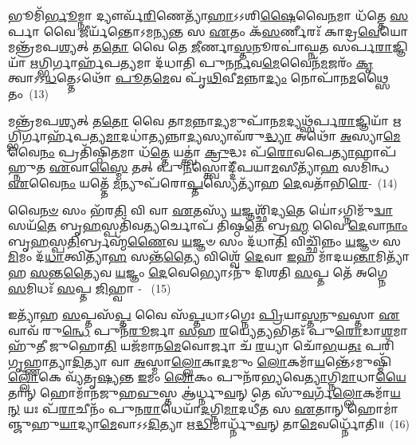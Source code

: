 𑌭𑍂𑌮𑌿᳴\-\ul{𑌰𑍍𑌭𑍂}\-𑌮𑍍𑌨𑌾 𑌦𑍍𑌯𑍗𑌰𑍍𑌵᳴\-\ul{𑌰𑌿}\-𑌣𑍇𑌤𑍍𑌯𑌾᳴\-\ul{𑌹𑌾}\-\-𑌽\-𑌽𑌶𑌿\-\ul{𑌷𑍈}\-𑌵𑍈\-\ul{𑌨}\-𑌮𑌾 𑌧᳴𑌤𑍍𑌤𑍇 \ul{𑌸}\-𑌰𑍍𑌪𑌾 𑌵𑍈 𑌜𑍀𑌰𑍍𑌯᳴𑌨𑍍𑌤𑍋\-𑌽𑌮𑌨𑍍𑌯\-\ul{𑌨𑍍𑌤} 𑌸 \ul{𑌏}\-𑌤𑌂 𑌕᳴\-\ul{𑌸}\-𑌰𑍍𑌣𑍀𑌰𑌃᳴ 𑌕𑌾𑌦𑍍𑌰\-\ul{𑌵𑍇}\-𑌯𑍋 𑌮𑌨𑍍𑌤𑍍𑌰᳴𑌮𑌪\-\ul{𑌶𑍍𑌯}\-𑌤𑍍 𑌤\-\ul{𑌤𑍋} 𑌵𑍈 𑌤𑍇 \ul{𑌜𑍀}\-𑌰𑍍𑌣𑌾\-\ul{𑌸𑍍𑌤}\-𑌨𑍂𑌰𑌪𑌾॑𑌘𑍍𑌨𑌤 𑌸𑌰𑍍𑌪\-\ul{𑌰𑌾}\-𑌜𑍍𑌞𑌿𑌯𑌾᳴ \ul{𑌋}\-𑌗𑍍𑌭𑌿𑌰𑍍𑌗𑌾𑌰𑍍\mbox{}𑌹᳴𑌪\-\ul{𑌤𑍍𑌯}\-𑌮𑌾 𑌦᳴𑌧𑌾𑌤𑌿 𑌪𑍁𑌨\-\ul{𑌰𑍍𑌨}\-𑌵\-\ul{𑌮𑍇}\-𑌵𑍈𑌨᳴\-\ul{𑌮}\-𑌜𑌰𑌂᳴ \ul{𑌕𑍃}\-𑌤𑍍𑌵𑌾\-𑌽\-𑌽\-\ul{𑌧}\-𑌤𑍍𑌤𑍇\-𑌽𑌥𑍋᳴ \ul{𑌪𑍂}\-𑌤\-\ul{𑌮𑍇}\-𑌵 𑌪𑍃᳴\-\ul{𑌥𑌿}\-𑌵𑍀\-\ul{𑌮}\-𑌨𑍍𑌨𑌾\-\ul{𑌦𑍍𑌯𑌂} 𑌨𑍋𑌪𑌾᳴𑌨\-\ul{𑌮}\-𑌥𑍍𑌸𑍈𑌤𑌂~(13)

𑌮𑌨𑍍𑌤𑍍𑌰᳴𑌮𑌪\-\ul{𑌶𑍍𑌯}\-𑌤𑍍 𑌤\-\ul{𑌤𑍋} 𑌵𑍈 𑌤𑌾\-\ul{𑌮}\-𑌨𑍍𑌨𑌾\-\ul{𑌦𑍍𑌯}\-𑌮𑍁𑌪𑌾᳴𑌨\-\ul{𑌮}\-𑌦𑍍𑌯𑌥𑍍𑌸᳴𑌰𑍍𑌪\-\ul{𑌰𑌾}\-𑌜𑍍𑌞𑌿𑌯𑌾᳴ \ul{𑌋}\-𑌗𑍍𑌭𑌿𑌰𑍍𑌗𑌾𑌰𑍍\mbox{}𑌹᳴𑌪𑌤𑍍𑌯\-\ul{𑌮𑌾}\-𑌦𑌧𑌾॑\-\ul{𑌤𑍍𑌯}\-𑌨𑍍𑌨𑌾\-\ul{𑌦𑍍𑌯}\-𑌸𑍍𑌯𑌾𑌵᳴𑌰𑍁\-\ul{𑌦𑍍𑌧𑍍𑌯𑌾} 𑌅𑌥𑍋᳴ \ul{𑌅}\-𑌸𑍍𑌯𑌾\-\ul{𑌮𑍇}\-𑌵𑍈\-\ul{𑌨𑌂} 𑌪𑍍𑌰𑌤𑌿᳴𑌷𑍍𑌠𑌿\-\ul{𑌤}\-𑌮𑌾 𑌧᳴\-\ul{𑌤𑍍𑌤𑍇} 𑌯𑌤𑍍𑌤𑍍𑌵𑌾॑ \ul{𑌕𑍍𑌰𑍁}\-𑌦𑍍𑌧𑌃 𑌪᳴\-\ul{𑌰𑍋}\-𑌵𑌪𑍇\-\ul{𑌤𑍍𑌯𑌾}\-𑌹𑌾𑌪᳴𑌹𑍍𑌨𑍁𑌤 \ul{𑌏}\-𑌵𑌾\-\ul{𑌸𑍍𑌮𑍈} 𑌤𑌤𑍍 𑌪𑍁\-\ul{𑌨}\-𑌸𑍍𑌤𑍍𑌵𑍋𑌦𑍍𑌦𑍀᳴𑌪𑌯𑌾\-\ul{𑌮}\-𑌸𑍀𑌤𑍍𑌯𑌾᳴\-\ul{𑌹} 𑌸𑌮𑌿᳴𑌨𑍍𑌧 \ul{𑌏}\-𑌵𑍈\-\ul{𑌨𑌂} 𑌯𑌤𑍍𑌤𑍇᳴ \ul{𑌮}\-𑌨𑍍𑌯𑍁𑌪᳴𑌰𑍋\-\ul{𑌪𑍍𑌤}\-𑌸𑍍𑌯𑍇𑌤𑍍𑌯𑌾᳴𑌹 \ul{𑌦𑍇}\-𑌵𑌤𑌾᳴𑌭𑌿\-\ul{𑌰𑍇}\--~(14)

𑌵𑍈\-\ul{𑌨}\-\-\ul{𑍞} 𑌸𑌂 𑌭᳴𑌰\-\ul{𑌤𑌿} 𑌵𑌿 𑌵𑌾 \ul{𑌏}\-𑌤𑌸𑍍𑌯᳴ \ul{𑌯}\-𑌜𑍍𑌞𑌶𑍍𑌛𑌿᳴𑌦𑍍𑌯\-\ul{𑌤𑍇} 𑌯𑍋॑\-𑌽𑌗𑍍𑌨𑌿𑌮𑍁᳴\-\ul{𑌦𑍍𑌵𑌾}\-𑌸𑌯᳴\-\ul{𑌤𑍇} 𑌬𑍃\-\ul{𑌹}\-𑌸𑍍𑌪𑌤𑌿᳴𑌵\-\ul{𑌤𑍍𑌯}\-𑌰𑍍𑌚𑍋𑌪᳴ 𑌤𑌿𑌷𑍍𑌠\-\ul{𑌤𑍇} 𑌬𑍍𑌰\-\ul{𑌹𑍍𑌮} 𑌵𑍈 \ul{𑌦𑍇}\-𑌵𑌾\-\ul{𑌨𑌾𑌂} 𑌬𑍃\-\ul{𑌹}\-𑌸𑍍𑌪\-\ul{𑌤𑌿}\-𑌰𑍍𑌬𑍍𑌰𑌹𑍍𑌮᳴\-\ul{𑌣𑍈}\-𑌵 \ul{𑌯}\-𑌜𑍍𑌞𑍞 𑌸𑌂 𑌦᳴𑌧𑌾\-\ul{𑌤𑌿} 𑌵𑌿𑌚𑍍𑌛𑌿᳴𑌨𑍍𑌨𑌂 \ul{𑌯}\-𑌜𑍍𑌞𑍞 𑌸\-\ul{𑌮𑌿}\-𑌮𑌂 𑌦᳴\-\ul{𑌧𑌾}\-𑌤𑍍𑌵𑌿𑌤𑍍𑌯𑌾᳴\-\ul{𑌹} 𑌸𑌨𑍍𑌤᳴\-\ul{𑌤𑍍𑌯𑍈} 𑌵𑌿𑌶𑍍𑌵𑍇᳴ \ul{𑌦𑍇}\-𑌵𑌾 \ul{𑌇}\-𑌹 𑌮𑌾᳴𑌦𑌯\-\ul{𑌨𑍍𑌤𑌾}\-𑌮𑌿𑌤𑍍𑌯𑌾᳴𑌹 \ul{𑌸}\-𑌨𑍍𑌤\-\ul{𑌤𑍍𑌯𑍈}\-𑌵 \ul{𑌯}\-𑌜𑍍𑌞𑌂 \ul{𑌦𑍇}\-𑌵𑍇𑌭𑍍𑌯𑍋\-𑌽𑌨𑍁᳴ 𑌦𑌿𑌶𑌤𑌿 \ul{𑌸}\-𑌪𑍍𑌤 𑌤𑍇᳴ 𑌅𑌗𑍍𑌨𑍇 \ul{𑌸}\-𑌮𑌿𑌧𑌃᳴ \ul{𑌸}\-𑌪𑍍𑌤 \ul{𑌜𑌿}\-𑌹𑍍𑌵𑌾 - ~(15)

𑌇𑌤𑍍𑌯𑌾᳴𑌹 \ul{𑌸}\-𑌪𑍍𑌤𑌸᳴\-\ul{𑌪𑍍𑌤} 𑌵𑍈 𑌸᳴\-\ul{𑌪𑍍𑌤}\-𑌧𑌾\-𑌽𑌗𑍍𑌨𑍇𑌃 \ul{𑌪𑍍𑌰𑌿}\-𑌯𑌾\-\ul{𑌸𑍍𑌤}\-𑌨𑍁\-\ul{𑌵}\-𑌸𑍍𑌤𑌾 \ul{𑌏}\-𑌵𑌾𑌵᳴ 𑌰𑍁\-\ul{𑌨𑍍𑌧𑍇} 𑌪𑍁𑌨᳴\-\ul{𑌰𑍂}\-𑌰𑍍𑌜𑌾 \ul{𑌸}\-𑌹 \ul{𑌰}\-𑌯𑍍𑌯𑍇\-\ul{𑌤𑍍𑌯}\-𑌭𑌿𑌤𑌃᳴ 𑌪𑍁\-\ul{𑌰𑍋}\-𑌡𑌾\-\ul{𑌶}\-𑌮𑌾𑌹𑍁᳴𑌤𑍀 𑌜𑍁𑌹𑍋\-\ul{𑌤𑌿} 𑌯𑌜᳴𑌮𑌾𑌨\-\ul{𑌮𑍇}\-𑌵𑍋𑌰𑍍𑌜𑌾 𑌚᳴ \ul{𑌰}\-𑌯𑍍𑌯𑌾 𑌚𑍋᳴\-\ul{𑌭}\-𑌯\-\ul{𑌤𑌃} 𑌪𑌰𑌿᳴ 𑌗𑍃𑌹𑍍𑌣𑌾𑌤𑍍𑌯𑌾\-\ul{𑌦𑌿}\-𑌤𑍍𑌯𑌾 𑌵𑌾 \ul{𑌅}\-𑌸𑍍𑌮𑌾\-\ul{𑌲𑍍𑌲𑍋}\-𑌕𑌾\-\ul{𑌦}\-𑌮𑍁𑌂 \ul{𑌲𑍋}\-𑌕𑌮𑌾᳴\-\ul{𑌯}\-𑌨𑍍𑌤𑍇᳴\-𑌽𑌮𑍁𑌷𑍍𑌮𑌿᳴\-\ul{𑌲𑍍𑌲𑍋𑌁}\-𑌕𑍇 𑌵𑍍𑌯᳴𑌤𑍃\-\ul{𑌷𑍍𑌯}\-𑌨𑍍𑌤 \ul{𑌇}\-𑌮𑌂 \ul{𑌲𑍋}\-𑌕𑌂 𑌪𑍁𑌨᳴𑌰\-\ul{𑌭𑍍𑌯}\-𑌵𑍇\-\ul{𑌤𑍍𑌯𑌾}\-𑌗𑍍𑌨𑌿\-\ul{𑌮𑌾}\-𑌧𑌾\-\ul{𑌯𑍈}\-𑌤𑌾𑌨𑍍 𑌹𑍋𑌮𑌾᳴𑌨𑌜𑍁𑌹\-\ul{𑌵𑍁}\-𑌸𑍍𑌤 𑌆॑𑌰𑍍𑌧𑍍𑌨𑍁\-\ul{𑌵}\-𑌨𑍍 𑌤𑍇 𑌸𑍁᳴\-\ul{𑌵}\-𑌰𑍍𑌗𑌁\-\ul{𑌲𑍍𑌲𑍋}\-𑌕𑌮𑌾᳴\-\ul{𑌯}\-\-\ul{𑌨𑍍} 𑌯𑌃 𑌪᳴\-\ul{𑌰𑌾}\-𑌚𑍀𑌨𑌂᳴ 𑌪𑍁𑌨\-\ul{𑌰𑌾}\-𑌧𑍇𑌯𑌾᳴\-\ul{𑌦}\-𑌗𑍍𑌨𑌿\-\ul{𑌮𑌾}\-𑌦𑌧𑍀᳴\-\ul{𑌤} 𑌸 \ul{𑌏}\-𑌤𑌾𑌨𑍍 𑌹𑍋𑌮𑌾॑𑌞𑍍𑌜𑍁𑌹𑍁\-\ul{𑌯𑌾}\-𑌦𑍍𑌯𑌾\-\ul{𑌮𑍇}\-𑌵𑌾\-𑌽\-𑌽\-\ul{𑌦𑌿}\-𑌤𑍍𑌯𑌾 𑌋\-\ul{𑌦𑍍𑌧𑌿}\-𑌮𑌾𑌰𑍍𑌧𑍍𑌨𑍁᳴\-\ul{𑌵}\-𑌨𑍍 𑌤𑌾\-\ul{𑌮𑍇}\-𑌵𑌰𑍍𑌧𑍍𑌨𑍋᳴𑌤𑌿॥~(16)


